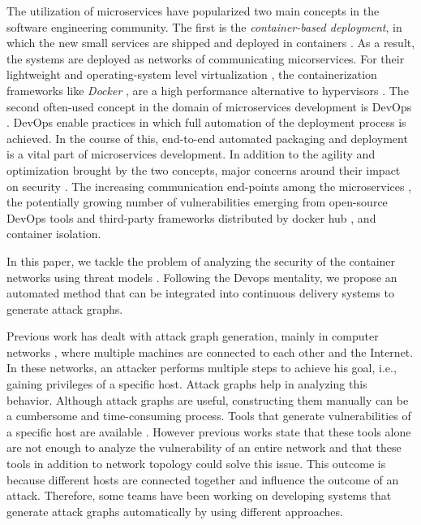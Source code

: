 The utilization of microservices have popularized two main concepts in the software engineering community. The first is the \textit{container-based deployment}, in which the new small services are shipped and deployed in containers \cite{bibid}. As a result, the systems are deployed as networks of communicating micorservices. For their lightweight and operating-system level virtualization \cite{what is the container hype}, the containerization frameworks like \textit{Docker} \cite{bibid}, are a high performance alternative to hypervisors \cite{nw}. The second often-used concept in the domain of microservices development is DevOps \cite{bibid}. DevOps enable practices in which full automation of the deployment process is achieved. In the course of this, end-to-end automated packaging and deployment  is a vital part of microservices development. In addition to the agility and optimization brought by the two concepts, major concerns around their impact on security \cite{ahmadvand2016requirements}. The increasing communication end-points among the microservices \cite{ahmadvand2016requirements}, the potentially growing number of vulnerabilities emerging from open-source DevOps tools and third-party frameworks distributed by docker hub \cite{shu2017study,gummaraju2015over}, and container isolation. 


 In this paper, we tackle the problem of analyzing the security of the container networks using threat models \cite{kordysurvey}. Following the Devops mentality, we propose an automated method that can be integrated into continuous delivery systems to generate attack graphs.



Previous work has dealt with attack graph generation, mainly in computer networks \cite{ingols2006practical, sheyner2002automated, ritchey2000using, ou2006scalable}, where multiple machines are connected to each other and the Internet. In these networks, an attacker performs multiple steps to achieve his goal, i.e., gaining privileges of a specific host. Attack graphs help in analyzing this behavior. Although attack graphs are useful, constructing them manually can be a cumbersome and time-consuming process. Tools that generate vulnerabilities of a specific host are available \cite{clair, artz2002netspa, farmer1990cops}. However previous works state that these tools alone are not enough to analyze the vulnerability of an entire network and that these tools in addition to network topology could solve this issue. This outcome is because different hosts are connected together and influence the outcome of an attack. Therefore, some teams have been working on developing systems that generate attack graphs automatically by using different approaches.


